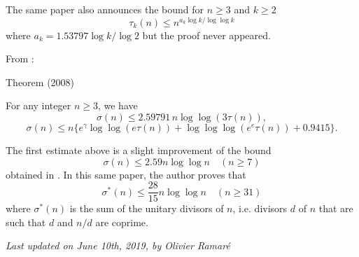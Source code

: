 The same paper also announces the bound for $n\ge3$ and $k\ge2$
$$
\tau_k(n)\le n^{a_k\log k/\log\log k}
$$
where $a_k=1.53797\log k / \log 2$ but the proof never appeared.

From \cite{Nicolas*08}:

\begin{thm}{Theorem (2008)}

For any integer $n\ge3$, we have
  $$\sigma(n)\le 2.59791\, n\log\log(3\tau(n)),$$
  $$\sigma(n)\le n\{ e^\gamma\log\log(e\tau(n))+\log\log\log(e^e\tau(n))+0.9415\}.$$
\end{thm}


The first estimate above is a slight improvement of the bound
  $$\sigma(n)\le 2.59 n\log\log n\quad(n\ge7)$$
obtained in
\cite{Ivic*77}. In this same paper,
  the author proves that
$$\sigma^*(n)\le \frac{28}{15} n\log\log n\quad(n\ge31)$$
where $\sigma^*(n)$ is the sum of the unitary divisors of $n$, i.e. divisors
  $d$ of $n$ that are such that $d$ and $n/d$ are coprime.







  
\begin{flushright}\small\sl{}   Last updated on June 10th, 2019, by Olivier Ramar\'e
 \end{flushright}














